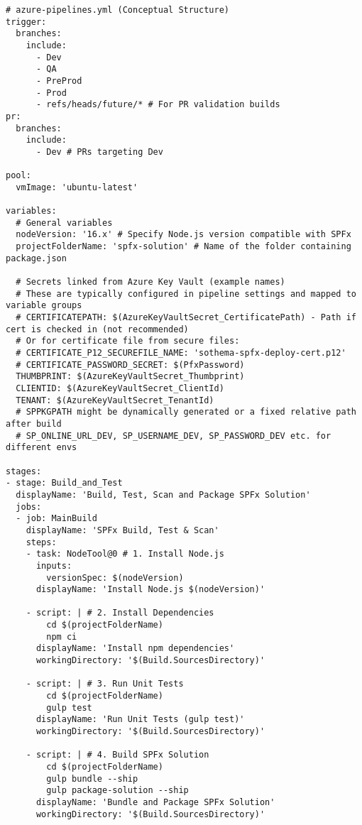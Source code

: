 \noindent\fbox{\begin{minipage}{\dimexpr\textwidth-2\fboxsep-2\fboxrule\relax}}
\begin{verbatim}
# azure-pipelines.yml (Conceptual Structure)
trigger:
  branches:
    include:
      - Dev
      - QA
      - PreProd
      - Prod
      - refs/heads/future/* # For PR validation builds
pr:
  branches:
    include:
      - Dev # PRs targeting Dev

pool:
  vmImage: 'ubuntu-latest'

variables:
  # General variables
  nodeVersion: '16.x' # Specify Node.js version compatible with SPFx
  projectFolderName: 'spfx-solution' # Name of the folder containing package.json

  # Secrets linked from Azure Key Vault (example names)
  # These are typically configured in pipeline settings and mapped to variable groups
  # CERTIFICATEPATH: $(AzureKeyVaultSecret_CertificatePath) - Path if cert is checked in (not recommended)
  # Or for certificate file from secure files:
  # CERTIFICATE_P12_SECUREFILE_NAME: 'sothema-spfx-deploy-cert.p12'
  # CERTIFICATE_PASSWORD_SECRET: $(PfxPassword)
  THUMBPRINT: $(AzureKeyVaultSecret_Thumbprint)
  CLIENTID: $(AzureKeyVaultSecret_ClientId)
  TENANT: $(AzureKeyVaultSecret_TenantId)
  # SPPKGPATH might be dynamically generated or a fixed relative path after build
  # SP_ONLINE_URL_DEV, SP_USERNAME_DEV, SP_PASSWORD_DEV etc. for different envs

stages:
- stage: Build_and_Test
  displayName: 'Build, Test, Scan and Package SPFx Solution'
  jobs:
  - job: MainBuild
    displayName: 'SPFx Build, Test & Scan'
    steps:
    - task: NodeTool@0 # 1. Install Node.js
      inputs:
        versionSpec: $(nodeVersion)
      displayName: 'Install Node.js $(nodeVersion)'

    - script: | # 2. Install Dependencies
        cd $(projectFolderName)
        npm ci
      displayName: 'Install npm dependencies'
      workingDirectory: '$(Build.SourcesDirectory)'

    - script: | # 3. Run Unit Tests
        cd $(projectFolderName)
        gulp test
      displayName: 'Run Unit Tests (gulp test)'
      workingDirectory: '$(Build.SourcesDirectory)'

    - script: | # 4. Build SPFx Solution
        cd $(projectFolderName)
        gulp bundle --ship
        gulp package-solution --ship
      displayName: 'Bundle and Package SPFx Solution'
      workingDirectory: '$(Build.SourcesDirectory)'


\end{verbatim}
